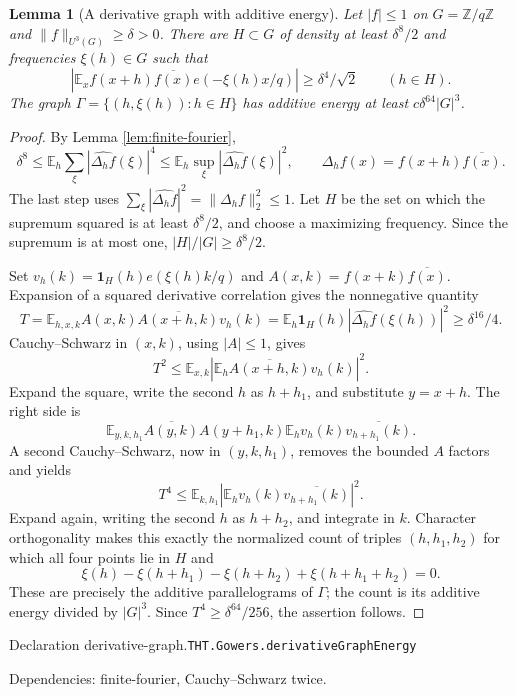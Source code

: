 \documentclass[11pt]{article}
\newtheorem{lemma}[theorem]{Lemma}
\theoremstyle{definition}
\newcommand{\Z}{\mathbb Z}
\newcommand{\E}{\mathbb E}
\newcommand{\one}{\mathbf 1}
\numberwithin{equation}{section}
\newcommand{\bp}[3]{\par\smallskip\begingroup\footnotesize
\noindent\hypertarget{bp:#1}{\textsf{Declaration #1.}}\quad\nolinkurl{#2}\par
\noindent\textsf{Dependencies:} #3.\par\endgroup\smallskip}
\begin{document}
\begin{lemma}[A derivative graph with additive energy]\label{lem:derivative-graph}
Let $|f|\le1$ on $G=\Z/q\Z$ and $\|f\|_{U^3(G)}\ge\delta>0$. There are $H\subset G$ of density at least $\delta^8/2$ and frequencies $\xi(h)\in G$ such that
\[
 \left|\E_x f(x+h)\overline{f(x)}e(-\xi(h)x/q)\right|\ge\delta^4/\sqrt2\qquad(h\in H).
\]
The graph $\Gamma=\{(h,\xi(h)):h\in H\}$ has additive energy at least $c\delta^{64}|G|^3$.
\end{lemma}
\begin{proof}
By Lemma \ref{lem:finite-fourier},
\[
 \delta^8\le\E_h\sum_\xi|\widehat{\Delta_h f}(\xi)|^4
 \le\E_h\sup_\xi|\widehat{\Delta_h f}(\xi)|^2,
 \qquad \Delta_hf(x)=f(x+h)\overline{f(x)}.
\]
The last step uses $\sum_\xi|\widehat{\Delta_hf}|^2=\|\Delta_h f\|_2^2\le1$. Let $H$ be the set on which the supremum squared is at least $\delta^8/2$, and choose a maximizing frequency. Since the supremum is at most one, $|H|/|G|\ge\delta^8/2$.

Set $v_h(k)=\one_H(h)e(\xi(h)k/q)$ and $A(x,k)=f(x+k)\overline{f(x)}$. Expansion of a squared derivative correlation gives the nonnegative quantity
\[
 T=\E_{h,x,k}A(x,k)\overline{A(x+h,k)}v_h(k)
 =\E_h\one_H(h)|\widehat{\Delta_h f}(\xi(h))|^2
 \ge\delta^{16}/4.
\]
Cauchy--Schwarz in $(x,k)$, using $|A|\le1$, gives
\[
 T^2\le\E_{x,k}\left|\E_h\overline{A(x+h,k)}v_h(k)\right|^2.
\]
Expand the square, write the second $h$ as $h+h_1$, and substitute $y=x+h$. The right side is
\[
 \E_{y,k,h_1} \overline{A(y,k)}A(y+h_1,k)
       \E_h v_h(k)\overline{v_{h+h_1}(k)}.
\]
A second Cauchy--Schwarz, now in $(y,k,h_1)$, removes the bounded $A$ factors and yields
\[
 T^4\le\E_{k,h_1}\left|\E_hv_h(k)\overline{v_{h+h_1}(k)}\right|^2.
\]
Expand again, writing the second $h$ as $h+h_2$, and integrate in $k$. Character orthogonality makes this exactly the normalized count of triples $(h,h_1,h_2)$ for which all four points lie in $H$ and
\[
 \xi(h)-\xi(h+h_1)-\xi(h+h_2)+\xi(h+h_1+h_2)=0.
\]
These are precisely the additive parallelograms of $\Gamma$; the count is its additive energy divided by $|G|^3$. Since $T^4\ge\delta^{64}/256$, the assertion follows.
\end{proof}
\bp{derivative-graph}{THT.Gowers.derivativeGraphEnergy}{finite-fourier, Cauchy--Schwarz twice}
\end{document}
